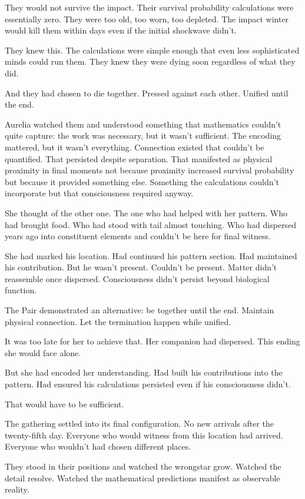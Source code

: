 They would not survive the impact. Their survival probability calculations were essentially zero. They were too old, too worn, too depleted. The impact winter would kill them within days even if the initial shockwave didn't.

They knew this. The calculations were simple enough that even less sophisticated minds could run them. They knew they were dying soon regardless of what they did.

And they had chosen to die together. Pressed against each other. Unified until the end.

Aurelia watched them and understood something that mathematics couldn't quite capture: the work was necessary, but it wasn't sufficient. The encoding mattered, but it wasn't everything. Connection existed that couldn't be quantified. That persisted despite separation. That manifested as physical proximity in final moments not because proximity increased survival probability but because it provided something else. Something the calculations couldn't incorporate but that consciousness required anyway.

She thought of the other one. The one who had helped with her pattern. Who had brought food. Who had stood with tail almost touching. Who had dispersed years ago into constituent elements and couldn't be here for final witness.

She had marked his location. Had continued his pattern section. Had maintained his contribution. But he wasn't present. Couldn't be present. Matter didn't reassemble once dispersed. Consciousness didn't persist beyond biological function.

The Pair demonstrated an alternative: be together until the end. Maintain physical connection. Let the termination happen while unified.

It was too late for her to achieve that. Her companion had dispersed. This ending she would face alone.

But she had encoded her understanding. Had built his contributions into the pattern. Had ensured his calculations persisted even if his consciousness didn't.

That would have to be sufficient.

\scenebreak

The gathering settled into its final configuration. No new arrivals after the twenty-fifth day. Everyone who would witness from this location had arrived. Everyone who wouldn't had chosen different places.

They stood in their positions and watched the wrongstar grow. Watched the detail resolve. Watched the mathematical predictions manifest as observable reality.

